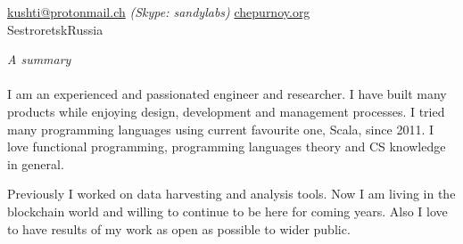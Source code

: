 \documentclass[10pt,a4paper]{article} %
\begin{document}
 



\noindent\href{mailto:kushti@protonmail.ch}{kushti@protonmail.ch}\bull %
\textit{(Skype: sandylabs)}\bull %
\href{http://chepurnoy.org}{chepurnoy.org}\\ %
Sestroretsk\bull Russia %

\spacedhrule{0.9em}{-0.4em} %



\vspace{-1.3em} %

\begin{multicols}{2}  %
\noindent \textit{A summary}\\\\
I am an experienced and passionated engineer and researcher. I have built many products while enjoying design, development and management processes. I tried many programming languages using current favourite one, Scala, since 2011. I love functional programming, programming languages theory and CS knowledge in general. 

Previously I worked on data harvesting and analysis tools. Now I am living in the blockchain world and willing to continue to be here for coming years.  Also I love to have results of my work as open as possible to wider public. 

\end{multicols}

\spacedhrule{0.5em}{-0.4em} %

\end{document}
